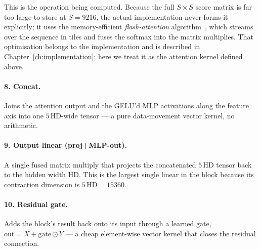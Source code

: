 \documentclass[11pt]{report}
\begin{document}
\noindent This is the operation being computed. Because the full
$S\times S$ score matrix is far too large to store at $S=9216$, the actual
implementation never forms it explicitly; it uses the memory-efficient
\emph{flash-attention} algorithm~\cite{dao2022flashattention}, which streams
over the sequence in tiles and fuses the softmax into the matrix
multiplies. That optimisation belongs
to the implementation and is described in
Chapter~\ref{ch:implementation}; here we treat it as the attention kernel
defined above.

\paragraph{8. Concat.} Joins the attention output and the GELU'd MLP
activations along the feature axis into one $5\,\mathrm{HD}$-wide tensor ---
a pure data-movement vector kernel, no arithmetic.

\paragraph{9. Output linear (proj+MLP-out).} A single fused matrix multiply
that projects the concatenated $5\,\mathrm{HD}$ tensor back to the hidden
width $\mathrm{HD}$. This is the largest single linear in the block because
its contraction dimension is $5\,\mathrm{HD}=15360$.

\paragraph{10. Residual gate.} Adds the block's result back onto its input
through a learned gate, $\text{out} = X + \text{gate}\odot Y$ --- a cheap
element-wise vector kernel that closes the residual connection.
\end{document}
